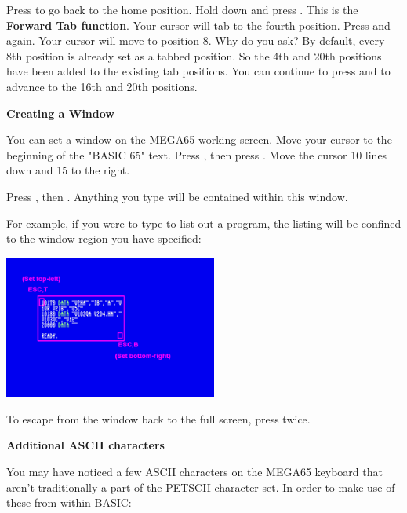 Press  to go back to the home position. Hold  down and press . This is the \textbf{Forward Tab function}. Your cursor will tab to the fourth position. Press  and  again. Your cursor will move to position 8. Why do you ask? By default, every 8th position is already set as a tabbed position. So the 4th and 20th positions have been added to the existing tab positions. You can continue to press  and  to advance to the 16th and 20th positions.

\textbf{Creating a Window}

You can set a window on the MEGA65 working screen. Move your cursor to the beginning of the "BASIC 65" text. Press , then press . Move the cursor 10 lines down and 15 to the right.

Press , then . Anything you type will be contained within this window.

For example, if you were to type  to list out a program, the listing will be confined to the window region you have specified:

\begin{center}
\includegraphics[width={7cm}]{images/set-window.png}
\end{center}

To escape from the window back to the full screen, press  twice.

\textbf{Additional ASCII characters}

You may have noticed a few ASCII characters on the MEGA65 keyboard that aren't traditionally a part of the PETSCII character set. In order to make use of these from within BASIC:

